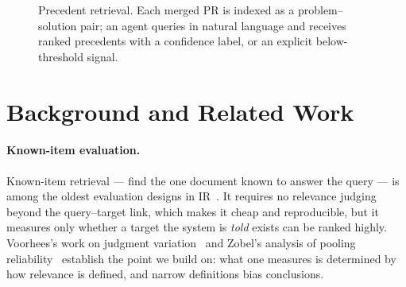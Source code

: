 \documentclass[sigconf,nonacm]{acmart}
\begin{document}
\begin{figure}[t]
\centering
{}
\caption{Precedent retrieval. Each merged PR is indexed as a
problem--solution pair; an agent queries in natural language and receives
ranked precedents with a confidence label, or an explicit below-threshold
signal.}
\label{fig:pipeline}
\end{figure}

\section{Background and Related Work}
\label{sec:related}

\paragraph{Known-item evaluation.}
Known-item retrieval --- find the one document known to answer the query ---
is among the oldest evaluation designs in IR~\cite{sparck1975ideal}. It
requires no relevance judging beyond the query--target link, which makes it
cheap and reproducible, but it measures only whether a target the system is
\emph{told} exists can be ranked highly. Voorhees's work on judgment
variation~\cite{voorhees2000variations} and Zobel's analysis of pooling
reliability~\cite{zobel1998reliable} establish the point we build on: what
one measures is determined by how relevance is defined, and narrow
definitions bias conclusions.
\end{document}
